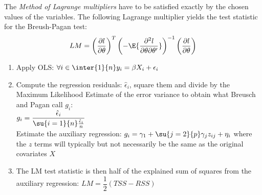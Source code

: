 The \emph{Method of Lagrange multipliers}  have to be satisfied
exactly by the chosen values of the variables.
The following Lagrange multiplier yields the  test statistic for the Breush-Pagan test:
$$ LM = \left(\dfrac{\partial l}{\partial\theta}\right)^{T}\left(-\E{\dfrac{\partial^{2}l}{\partial\theta\partial\theta'}}\right)^{-1}\left(\dfrac{\partial l}{\partial\theta}\right)$$
\begin{enumerate}
	\item Apply OLS: $\forall i\in\inter{1}{n} y_{i}=\beta X_{i} + \epsilon_{i}$
	\item Compute the regression residuals: $\hat{\epsilon}_{i}$, square them and divide by 
		the Maximum Likelihood Estimate of the error variance to obtain what Breusch and
		Pagan call $g_{i}$:\\
		$g_{i}=\dfrac{\hat{\epsilon}_{i}}{\su{{i=1}}{n}\frac{\hat{\epsilon}_{i}}{n}}$\\
		Estimate the auxiliary regression:
		$g_{i} = \gamma_{1} + \su{{j=2}}{p}\gamma_{j}z_{ij} +\eta_{i}$ where the $z$ terms
		will typically but not necessarily be the same as the original covariates $X$
	\item The LM test statistic is then half of the explained sum of squares from the 
		auxiliary regression: $LM = \dfrac{1}{2}\left(TSS-RSS\right)$
\end{enumerate}
